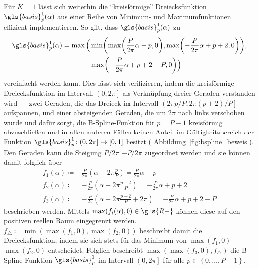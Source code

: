 

Für $K=1$ lässt sich weiterhin die \enquote{kreisförmige} Dreiecksfunktion $\gls{basis}_p^1\left(\alpha\right)$ aus einer Reihe von Minimum- und Maximumfunktionen effizient implementieren.
So gilt, dass $\gls{basis}_p^1\left(\alpha\right)$ zu
\begin{equation*}
  \begin{split}
    \gls{basis}_p^1\left(\alpha\right) = \max \Big( & \min \left( \max\left(\frac{P}{2\pi}\alpha - p, 0\right), \max\left(-\frac{P}{2\pi}\alpha + p + 2, 0\right)\right),\\
    & \max\left(-\frac{P}{2\pi}\alpha + p + 2 - P, 0\right) \Big)
  \end{split}
\end{equation*}
vereinfacht werden kann.
Dies lässt sich verifizieren, indem die kreisförmige Dreiecksfunktion im Intervall $\left(0, 2\pi\right]$ als Verknüpfung dreier Geraden verstanden wird — zwei Geraden, die das Dreieck im Intervall $\left(2\pi p/P, 2\pi \left(p+2\right)/P\right]$ aufspannen, und einer absteigenden Geraden, die um $2\pi$ nach links verschoben wurde und dafür sorgt, die B-Spline-Funktion für $p=P-1$ kreisförmig abzuschließen und in allen anderen Fällen keinen Anteil im Gültigkeitsbereich der Funktion $\gls{basis}_p^1 \colon \left(0,2\pi\right] \to \left[0,1\right]$ besitzt (\vgl{} Abbildung~\ref{fig:bspline_beweis}).
Den Geraden kann die Steigung $P/2\pi$ \bzw{} $-P/2\pi$ zugeordnet werden und sie können damit folglich über
\begin{equation*}
\begin{split}
  f_1\left(\alpha\right) \coloneqq & \frac{P}{2\pi}\left(\alpha - 2\pi\frac{p}{P}\right) = \frac{P}{2\pi}\alpha - p\\
  f_2\left(\alpha\right) \coloneqq & - \frac{P}{2\pi}\left(\alpha - 2\pi\frac{p+2}{P}\right) = - \frac{P}{2\pi}\alpha + p + 2\\
  f_3\left(\alpha\right) \coloneqq & - \frac{P}{2\pi}\left(\alpha - 2\pi\frac{p+2}{P} + 2\pi\right) = - \frac{P}{2\pi}\alpha + p + 2 - P
\end{split}
\end{equation*}
beschrieben werden.
Mittels $\max\left(f_i\left(\alpha\right), 0\right) \in \gls{R+}$ können diese auf den positiven reellen Raum eingegrenzt werden.
$f_{\triangle} \coloneqq \min\left(\max\left(f_1, 0\right), \max\left(f_2, 0\right)\right)$ beschreibt damit die Dreiecksfunktion, indem sie sich stets für das Minimum von $\max\left(f_1, 0\right)$ \bzw{} $\max\left(f_2,0\right)$ entscheidet.
Folglich beschreibt $\max\left(\max\left(f_3,0\right), f_{\triangle}\right)$ die B-Spline-Funktion $\gls{basis}_p^1$ im Intervall $\left(0, 2\pi\right]$ für alle $p \in \left\{0, \ldots, P-1\right\}$.
